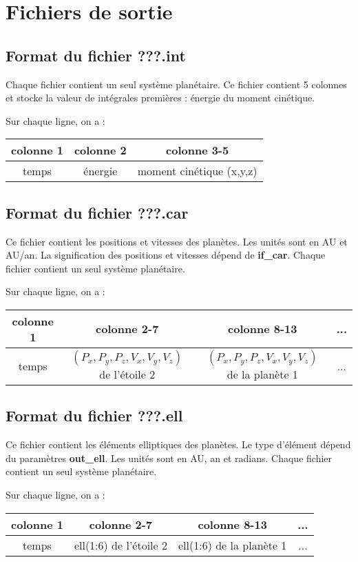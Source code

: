 \documentclass[11pt]{article}
\begin{document}
\section{Fichiers de sortie}

\subsection{Format du fichier {\bf ???.int} }

Chaque fichier contient un seul syst\`eme plan\'etaire.
Ce fichier contient 5 colonnes et stocke la valeur de int\'egrales premi\`eres  : \'energie du moment cin\'etique.

Sur chaque ligne, on a : 

\begin{tabular}{|c|c|c|} \hline
colonne 1 &  colonne 2 & colonne 3-5 \\ \hline
temps & \'energie & moment cin\'etique (x,y,z)\\    \hline
\end{tabular}


\subsection{Format du fichier {\bf ???.car} }

Ce fichier contient les positions et vitesses des plan\`etes. Les unit\'es sont en AU et AU/an.
La signification des positions et vitesses d\'epend de  {\bf if\_car}.
Chaque fichier contient un seul syst\`eme plan\'etaire.

Sur chaque ligne, on a : 

\begin{tabular}{|c|c|c|c|} \hline
colonne 1 &   colonne 2-7 & colonne 8-13 & ... \\ \hline
temps & $(P_x,P_y,P_z,V_x,V_y,V_z)$ de l'\'etoile 2  & $(P_x,P_y,P_z,V_x,V_y,V_z)$ de la plan\`ete 1 & ... \\    \hline
\end{tabular}


\subsection{Format du fichier {\bf ???.ell} }

Ce fichier contient les \'el\'ements elliptiques des plan\`etes. 
Le type d'\'el\'ement d\'epend du param\`etres  {\bf out\_ell}. Les unit\'es sont en AU, an et radians.
Chaque fichier contient un seul syst\`eme plan\'etaire.

Sur chaque ligne, on a : 

\begin{tabular}{|c|c|c|c|} \hline
colonne 1 &   colonne 2-7 & colonne 8-13 & ... \\ \hline
temps & ell(1:6) de l'\'etoile 2  & ell(1:6) de la plan\`ete 1 & ... \\    \hline
\end{tabular}
\end{document}
